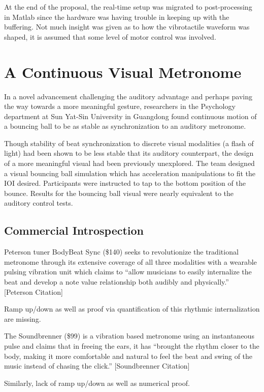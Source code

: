 At the end of the proposal, the real-time setup was migrated to post-processing in Matlab since the hardware was having trouble in keeping up with the buffering. Not much insight was given as to how the vibrotactile waveform was shaped, it is assumed that some level of motor control was involved.

\section{A Continuous Visual Metronome} \label{visualMet}
In a novel advancement challenging the auditory advantage and perhaps paving the way towards a more meaningful gesture, researchers in the Psychology department at Sun Yat-Sin University in Guangdong found continuous motion of a bouncing ball to be as stable as synchronization to an auditory metronome.
~\cite{gan2015synchronization}

Though stability of beat synchronization to discrete visual modalities (a flash of light) had been shown to be less stable that its auditory counterpart, the design of a more meaningful visual had been previously unexplored. The team designed a visual bouncing ball simulation which has acceleration manipulations to fit the IOI desired. Participants were instructed to tap to the bottom position of the bounce. Results for the bouncing ball visual were nearly equivalent to the auditory control tests.

\subsection{Commercial Introspection} \label{commercial}
Peterson tuner BodyBeat Sync (\$140) seeks to revolutionize the traditional metronome through its extensive coverage of all three modalities with a wearable pulsing vibration unit which claims to “allow musicians to easily internalize the beat and develop a note value relationship both audibly and physically.” [Peterson Citation]

Ramp up/down as well as proof via quantification of this rhythmic internalization are missing.

The Soundbrenner (\$99) is a vibration based metronome using an instantaneous pulse and claims that in freeing the ears, it has “brought the rhythm closer to the body, making it more comfortable and natural to feel the beat and swing of the music instead of chasing the click.” [Soundbrenner Citation]

Similarly, lack of ramp up/down as well as numerical proof.